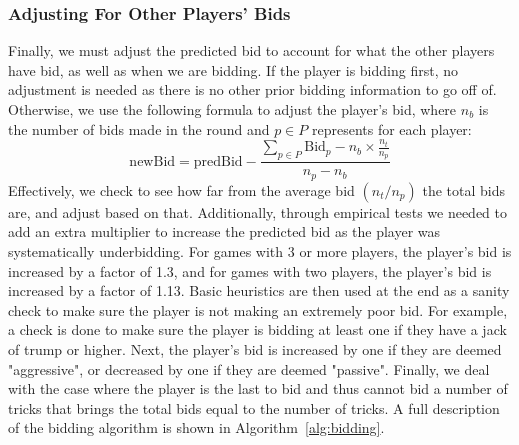 \documentclass{article}
\begin{document}
\subsubsection{Adjusting For Other Players' Bids}
\label{subsubsection:adjOtherPlayers}
Finally, we must adjust the predicted bid to account for what the other players have bid, as well as when we are bidding. If the player is bidding first, no adjustment is needed as there is no other prior bidding information to go off of.
Otherwise, we use the following formula to adjust the player's bid, where $n_b$ is the number of bids made in the round and $p \in P$ represents for each player:
$$\text{newBid} = \text{predBid} - \frac{\sum_{p \in P}\text{Bid}_p - n_b\times\frac{n_t}{n_p}}{n_p-n_b}$$
Effectively, we check to see how far from the average bid $(n_t/n_p)$ the total bids are, and adjust based on that. Additionally, through empirical tests we needed to add an extra multiplier to increase the predicted bid as the player was systematically underbidding.
For games with 3 or more players, the player's bid is increased by a factor of 1.3, and for games with two players, the player's bid is increased by a factor of 1.13. Basic heuristics are then used at the end as a sanity check to make sure the player is not making an extremely poor bid. For example, a check is done to make sure the player is bidding at least one if they have a jack of trump or higher. Next, the player's bid is increased by one if they are deemed "aggressive", or decreased by one if they are deemed "passive". Finally, we deal with the case where the player is the last to bid and thus cannot bid a number of tricks that brings the total bids equal to the number of tricks. A full description of the bidding algorithm is shown in Algorithm~\ref{alg:bidding}.
\end{document}
